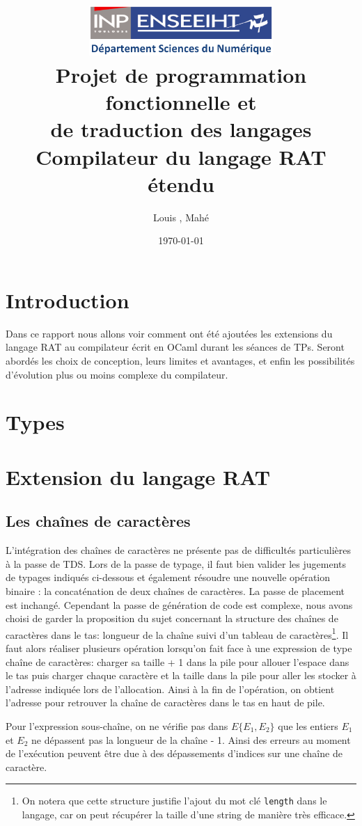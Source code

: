 \documentclass[11pt,a4paper]{article}
\title{\vspace{-1cm}\includegraphics[width=7cm]{n7.png}\\ Projet de programmation fonctionnelle et \\de traduction des langages\\ Compilateur du langage RAT étendu}
\author{Louis \bsc{Blenner}, Mahé \bsc{Tardy}}
\date{\today}
\begin{document}
\maketitle
\tableofcontents

\section{Introduction}
Dans ce rapport nous allons voir comment ont été ajoutées les extensions du langage RAT au compilateur écrit en OCaml durant les séances de TPs. Seront abordés les choix de conception, leurs limites et avantages, et enfin les possibilités d'évolution plus ou moins complexe du compilateur.

\section{Types}
\section{Extension du langage RAT}
\subsection{Les chaînes de caractères}

L'intégration des chaînes de caractères ne présente pas de difficultés particulières à la passe de TDS. Lors de la passe de typage, il faut bien valider les jugements de typages indiqués ci-dessous et également résoudre une nouvelle opération binaire : la concaténation de deux chaînes de caractères. La passe de placement est inchangé. Cependant la passe de génération de code est complexe, nous avons choisi de garder la proposition du sujet concernant la structure des chaînes de caractères dans le tas: longueur de la chaîne suivi d'un tableau de caractères\footnote{On notera que cette structure justifie l'ajout du mot clé \texttt{length} dans le langage, car on peut récupérer la taille d'une string de manière très efficace.}. Il faut alors réaliser plusieurs opération lorsqu'on fait face à une expression de type chaîne de caractères: charger sa taille + 1 dans la pile pour allouer l'espace dans le tas puis charger chaque caractère et la taille dans la pile pour aller les stocker à l'adresse indiquée lors de l'allocation. Ainsi à la fin de l'opération, on obtient l'adresse pour retrouver la chaîne de caractères dans le tas en haut de pile.

Pour l'expression sous-chaîne, on ne vérifie pas dans $E\{E_1,E_2\}$ que les entiers $E_1$ et $E_2$ ne dépassent pas la longueur de la chaîne - 1. Ainsi des erreurs au moment de l'exécution peuvent être due à des dépassements d'indices sur une chaîne de caractère.
\end{document}
